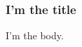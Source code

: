 \documentclass{beamer}
\begin{document}
\begin{frame}
\frametitle{I'm the title}

I'm the body.
\end{frame}
\end{document}
